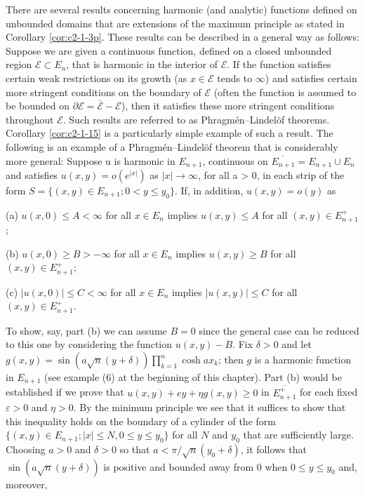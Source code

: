  There are several results concerning harmonic (and analytic) functions defined on unbounded domains that are extensions of the maximum principle as stated in Corollary \ref{cor:c2-1-3p}. These results can be described in a general way as follows: Suppose we are given a continuous function, defined on a closed unbounded region $\mathcal{E} \subset E_n$, that is harmonic in the interior of $\mathcal{E}$. If the function satisfies certain weak restrictions on its growth (as $x \in \mathcal{E}$ tends to $\infty$) and satisfies certain more stringent conditions on the boundary of $\mathcal{E}$ (often the function is assumed to be bounded on $\partial \mathcal{E} = \bar{\mathcal{E}} - \mathcal{E}$), then it satisfies these more stringent conditions throughout $\mathcal{E}$. Such results are referred to as Phragmén--Lindelöf theorems. Corollary \ref{cor:c2-1-15} is a particularly simple example of such a result. The following is an example of a Phragmén--Lindelöf theorem that is considerably more general: Suppose u is harmonic in $E_{n+1}$, continuous on $\overline{E_{n+1}} = E_{n+1} \cup E_n$ and satisfies $u(x, y) = o(e^{|x|})$ as $|x| \to \infty$, for all a > 0, in each strip of the form $S = \{(x, y) \in E_{n+1}; 0 < y \leq y_0\}$. If, in addition, $u(x, y) = o(y)$ as

(a) $u(x, 0) \leq A < \infty$ for all $x \in E_n$ implies $u(x, y) \leq A$ for all $(x, y) \in E_{n+1}^+$;

(b) $u(x,0) \geq B > -\infty$ for all $x \in E_n$ implies $u(x,y) \geq B$ for all $(x,y) \in E_{n+1}^+$;

(c) $|u(x,0)| \leq C < \infty$ for all $x \in E_n$ implies $|u(x,y)| \leq C$ for all $(x,y) \in E_{n+1}^+$.

To show, say, part (b) we can assume $B = 0$ since the general case can be reduced to this one by considering the function $u(x, y) - B$. Fix $\delta > 0$ and let $g(x, y) = \sin(a\sqrt{n}(y + \delta)) \prod_{k=1}^{n} \cosh ax_k$; then $g$ is a harmonic function in $E_{n+1}$ (see example (6) at the beginning of this chapter). Part (b) would be established if we prove that $u(x, y) + ey + \eta g(x, y) \geq 0$ in $\overline{E_{n+1}^+}$ for each fixed $\varepsilon > 0$ and $\eta > 0$. By the minimum principle we see that it suffices to show that this inequality holds on the boundary of a cylinder of the form $\{(x, y) \in E_{n+1}; |x| \leq N, 0 \leq y \leq y_0\}$ for all $N$ and $y_0$ that are sufficiently large. Choosing $a > 0$ and $\delta > 0$ so that $a < \pi/\sqrt{n}(y_0 + \delta)$, it follows that $\sin(a\sqrt{n}(y + \delta))$ is positive and bounded away from $0$ when $0 \leq y \leq y_0$ and, moreover,

